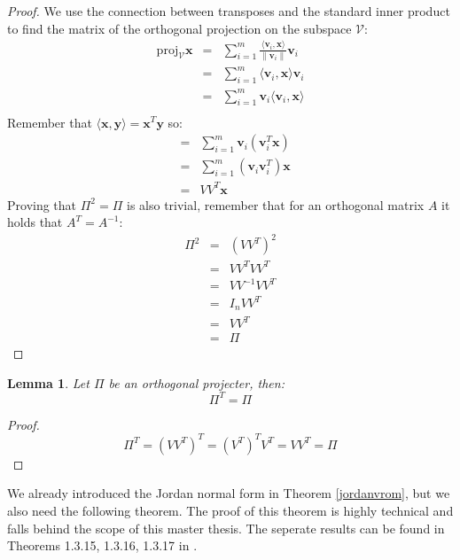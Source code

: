 \documentclass[a4paper,11pt]{report}
\newtheorem{lemma}[theorem]{Lemma}
\begin{document}
\begin{proof}
We use the connection between transposes and the standard inner product to find the matrix of the 
    orthogonal projection on the subspace $\mathcal{V}$:
  \begin{eqnarray*}
    \text{proj}_\mathcal{V}\mathbf{x} &=& \sum_{i=1}^{m} \frac{ \langle\mathbf{v}_i,\mathbf{x} \rangle}{\|\mathbf{v}_i\|}\mathbf{v}_i\\
  &=& \sum_{i=1}^{m} \langle\mathbf{v}_i,\mathbf{x}\rangle\mathbf{v}_i\\
  &=& \sum_{i=1}^{m} \mathbf{v}_i\langle\mathbf{v}_i,\mathbf{x}\rangle\\
  \end{eqnarray*}
  Remember that $\langle \mathbf{x}, \mathbf{y} \rangle = \mathbf{x}^T\mathbf{y}$ 
  so:
   \begin{eqnarray*}
  &=& \sum_{i=1}^{m} \mathbf{v}_i(\mathbf{v}_i^T\mathbf{x})\\
  &=& \sum_{i=1}^{m} (\mathbf{v}_i\mathbf{v}_i^T)\mathbf{x}\\
  &=& VV^T\mathbf{x}
  \end{eqnarray*}
Proving that $\Pi^2 =\Pi$ is also trivial, remember that for an orthogonal matrix $A$ it holds that $A^T = A^{-1}$:
  \begin{eqnarray*}
 \Pi^2 &=& (VV^T)^2\\
  &=& VV^TVV^T\\
  &=& VV^{-1}VV^T\\
  &=& I_nVV^T\\
  &=& VV^T\\
  &=& \Pi
  \end{eqnarray*}
\end{proof}

\begin{lemma}
  Let $\Pi$ be an orthogonal projecter, then:
  $$\Pi^T = \Pi$$
\end{lemma}
\begin{proof}
  $$\Pi^T = (VV^T)^T = (V^T)^T V^T = VV^T = \Pi$$
\end{proof}

We already introduced the Jordan normal form in Theorem \ref{jordanvrom}, but we 
also need the following theorem. The proof of this theorem is highly technical 
and falls behind the scope of this master thesis. The seperate results can be 
found in Theorems 1.3.15, 1.3.16, 1.3.17 in \cite{kieboom}.
\end{document}
